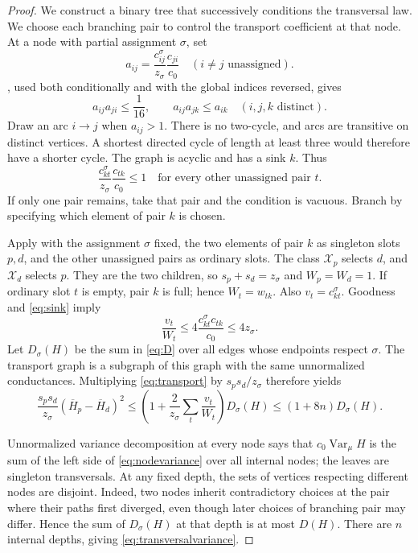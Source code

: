 \documentclass[11pt]{article}
\theoremstyle{definition}
\newcommand{\Var}{\operatorname{Var}}
\begin{document}
\begin{proof}
We construct a binary tree that successively conditions the transversal
law.  We choose each branching pair to control the transport coefficient
at that node.  At a node with partial assignment $\sigma$, set
\[
 a_{ij}=\frac{c^{\sigma}_{ij}}{z_{\sigma}}\frac{c_{ji}}{c_0}
 \quad (i\ne j\text{ unassigned}).
\]
, used both conditionally and with the global
indices reversed, gives
\begin{equation}\label{eq:scores}
 a_{ij}a_{ji}\le\frac1{16},\qquad
 a_{ij}a_{jk}\le a_{ik}\quad(i,j,k\text{ distinct}).
\end{equation}
Draw an arc $i\to j$ when $a_{ij}>1$.  There is no two-cycle, and arcs
are transitive on distinct vertices.  A shortest directed cycle of
length at least three would therefore have a shorter cycle.  The graph
is acyclic and has a sink $k$.  Thus
\begin{equation}\label{eq:sink}
 \frac{c^{\sigma}_{kt}}{z_{\sigma}}\frac{c_{tk}}{c_0}\le1
 \quad\text{for every other unassigned pair }t.
\end{equation}
If only one pair remains, take that pair and the condition is vacuous.
Branch by specifying which element of pair $k$ is chosen.

Apply  with the assignment $\sigma$ fixed, the two
elements of pair $k$ as singleton slots $p,d$, and the other unassigned
pairs as ordinary slots.  The class $\mathcal X_p$ selects $d$, and
$\mathcal X_d$ selects $p$.  They are the two children, so
$s_p+s_d=z_{\sigma}$ and $W_p=W_d=1$.  If ordinary slot $t$ is empty, pair
$k$ is full; hence $W_t=w_{tk}$.  Also $v_t=c^{\sigma}_{kt}$.  Goodness and
\eqref{eq:sink} imply
\begin{equation}\label{eq:sinkbound}
 \frac{v_t}{W_t}\le4\frac{c^{\sigma}_{kt}c_{tk}}{c_0}\le4z_{\sigma}.
\end{equation}
Let $D_{\sigma}(H)$ be the sum in \eqref{eq:D} over all edges whose endpoints
respect $\sigma$.  The transport graph is a subgraph of this graph with the
same unnormalized conductances.  Multiplying \eqref{eq:transport} by $s_ps_d/z_{\sigma}$
therefore yields
\begin{equation}\label{eq:nodevariance}
 \frac{s_ps_d}{z_{\sigma}}(\overline H_p-\overline H_d)^2
 \le\left(1+\frac2{z_{\sigma}}\sum_t\frac{v_t}{W_t}\right)D_{\sigma}(H)
 \le(1+8n)D_{\sigma}(H).
\end{equation}

Unnormalized variance decomposition at every node says that
$c_0\Var_\mu H$ is the sum of the left side of \eqref{eq:nodevariance}
over all internal nodes; the leaves are singleton transversals.
At any fixed depth, the sets of vertices respecting different nodes are
disjoint.  Indeed, two nodes inherit contradictory choices at the pair
where their paths first diverged, even though later choices of branching
pair may differ.  Hence the sum of $D_{\sigma}(H)$ at that depth is at most
$D(H)$.  There are $n$ internal depths, giving
\eqref{eq:transversalvariance}.
\end{proof}
\end{document}
